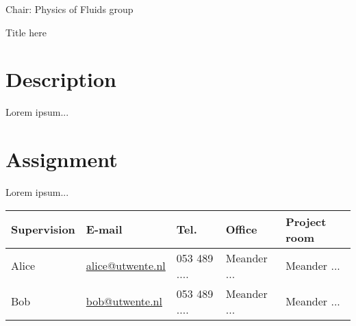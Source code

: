 \documentclass[a4paper,10pt]{article}
\begin{document}
 
\thispagestyle{empty} %

\noindent Chair: Physics of Fluids group
\begin{center}
 \begin{LARGE}
  Title here
 \end{LARGE}
\end{center}

\section*{Description}
Lorem ipsum...


\section*{Assignment}
Lorem ipsum...

\begin{center}
\begin{tabular}{|l|l|l|l|l|}
\hline \textbf{Supervision} & \textbf{E-mail} & \textbf{Tel.} & \textbf{Office} & \textbf{Project room} \\ 
\hline Alice & \href{mailto:alice@utwente.nl}{alice@utwente.nl} & 053 489 .... & Meander ... & Meander ... \\ 
\hline Bob   & \href{mailto:bob@utwente.nl}{bob@utwente.nl}     & 053 489 .... & Meander ... & Meander ... \\ 
\hline 
\end{tabular} 
\end{center}
\end{document}
